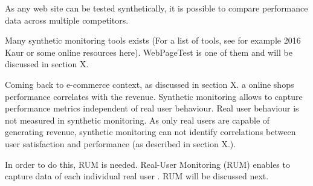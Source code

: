 As any web site can be tested synthetically, it is possible to compare performance data across multiple competitors. %



Many synthetic monitoring tools exists (For a list of tools, see for example 2016 Kaur or some online resources here).
WebPageTest is one of them and will be discussed in section X.



Coming back to e-commerce context, as discussed in section X.  a online shops performance correlates with the revenue.
Synthetic monitoring allows to capture performance metrics independent of real user behaviour.
Real user behaviour is not measured in synthetic monitoring.
As only real users are capable of generating revenue, synthetic monitoring can not identify correlations between user satisfaction and performance (as described in section X.).%

In order to do this, RUM is needed.
Real-User Monitoring (RUM) enables to capture data of each individual real user .
RUM will be discussed next.


















